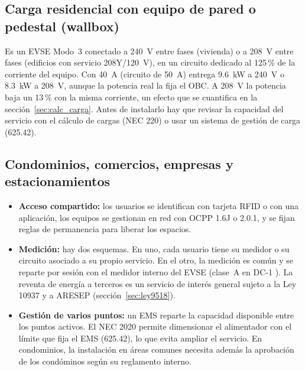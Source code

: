 \subsection{Carga residencial con equipo de pared o pedestal (wallbox)}
Es un EVSE Modo~3 conectado a 240~V entre fases (vivienda) o a 208~V entre fases (edificios con servicio 208Y/120~V), en un circuito dedicado al 125\,\% de la corriente del equipo. Con \SI{40}{\ampere} (circuito de \SI{50}{\ampere}) entrega \SI{9.6}{\kilo\watt} a 240~V o \SI{8.3}{\kilo\watt} a 208~V, aunque la potencia real la fija el OBC. A 208~V la potencia baja un 13\,\% con la misma corriente, un efecto que se cuantifica en la sección~\ref{sec:calc_carga}. Antes de instalarlo hay que revisar la capacidad del servicio con el cálculo de cargas (NEC 220) o usar un sistema de gestión de carga (625.42).

\subsection{Condominios, comercios, empresas y estacionamientos}
\begin{itemize}
\item \textbf{Acceso compartido:} los usuarios se identifican con tarjeta RFID o con una aplicación, los equipos se gestionan en red con OCPP 1.6J o 2.0.1, y se fijan reglas de permanencia para liberar los espacios.
\item \textbf{Medición:} hay dos esquemas. En uno, cada usuario tiene su medidor o su circuito asociado a su propio servicio. En el otro, la medición es común y se reparte por sesión con el medidor interno del EVSE (clase~A en DC-1 \cite{autelDC}). La reventa de energía a terceros es un servicio de interés general sujeto a la Ley 10937 y a ARESEP (sección~\ref{sec:ley9518}).
\item \textbf{Gestión de varios puntos:} un EMS reparte la capacidad disponible entre los puntos activos. El NEC 2020 permite dimensionar el alimentador con el límite que fija el EMS (625.42), lo que evita ampliar el servicio. En condominios, la instalación en áreas comunes necesita además la aprobación de los condóminos según su reglamento interno.
\end{itemize}

